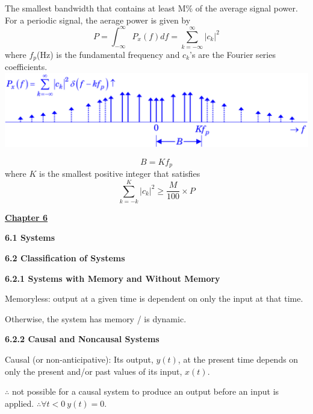 \documentclass[landscape,a4paper]{extarticle}
\newenvironment{Figure}
  {\noindent\minipage{\linewidth}}
  {\endminipage\par\medskip}
\begin{document}
\begin{multicols*}{5}
    The smallest bandwidth that contains at least M\% of the average signal power. For a periodic signal, the aerage power is given by
    \[
        P = \int_{-\infty}^{\infty}P_x(f)df=\sum_{k=-\infty}^{\infty}|c_k|^2
    \]
    where $f_p$(Hz) is the fundamental frequency and $c_k$'s are the Fourier series coefficients.
    \begin{Figure}
        \centering
        \includegraphics[width=\linewidth]{MPercentPower.png}
    \end{Figure}
    \[
        B = Kf_p
    \]
    where $K$ is the smallest positive integer that satisfies 
    \[
        \sum_{k=-k}^{K}|c_k|^2 \geq \frac{M}{100} \times P
    \]

    \textbf{\uline{Chapter 6}}

    \textbf{6.1 Systems}


    \textbf{6.2 Classification of Systems}

    \textbf{6.2.1 Systems with Memory and Without Memory}

    Memoryless: output at a given time is dependent on only the input at that time.

    Otherwise, the system has memory / is dynamic.

    \textbf{6.2.2 Causal and Noncausal Systems}

    Causal (or non-anticipative): Its output, $y(t)$, at the present time depends on only the present and/or past values of its input, $x(t)$.

    $\therefore$ not possible for a causal system to produce an output before an input is applied. $\therefore \forall t < 0\ y(t)=0$.


\end{multicols*}
\end{document}
